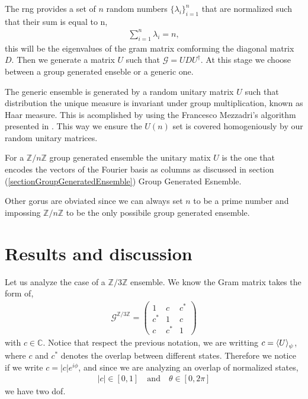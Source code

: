 \documentclass[12pt,letterpaper]{article}
\begin{document}
\begin{multicols}{2}
The \gls{rng} provides a set of $n$ random numbers $\{\lambda_i\}_{i=1}^n$ that are normalized such that their sum is equal to n,
\begin{align*}
	\sum_{i=1}^n\lambda_i=n,
\end{align*}
this will be the eigenvalues of the gram matrix comforming the diagonal matrix $D$. Then we generate a matrix $U$ such that $\mathcal{G}=UDU^\dagger$. At this stage we choose between a group generated enseble or a generic one. 

The generic ensemble is generated by a random unitary matrix $U$ such that distribution the unique measure is invariant under group multiplication, known as Haar measure\cite{haarMeasure}. This is acomplished by using the Francesco Mezzadri's algorithm presented in \cite{UnitaryMatricesGeneration}. This way we ensure the $U(n)$ set is covered homogeniously by our random unitary matrices.

For a $\mathbb{Z}/n\mathbb{Z}$ group generated ensemble the unitary matix $U$ is the one that encodes the vectors of the Fourier basis as columns as discussed in section (\ref{sectionGroupGeneratedEnsemble}) Group Generated Esnemble. 

Other gorus are obviated since we can always set $n$ to be a prime number and impossing $\mathbb{Z}/n\mathbb{Z}$ to be the only possibile group generated ensemble.

\section{Results and discussion}
 
Let us analyze the case of a $\mathbb{Z}/3\mathbb{Z}$ ensemble. We know the Gram matrix takes the form of,
\begin{align*}
	\mathcal{G}^{\mathbb{Z}/3\mathbb{Z}}=\begin{pmatrix}
		1 & c & c^*\\
		c^* & 1 & c\\
		c & c^* & 1
	\end{pmatrix}
\end{align*}
with $c\in\mathbb{C}$. Notice that respect the previous notation, we are writting $c=\braket{U}_{\psi}$, where $c$ and $c^*$ denotes the overlap between different states. Therefore we notice if we write $c=|c|e^{i\phi}$, and since we are analyzing an overlap of normalized states,
\begin{align*}
	|c|\in [0,1]\quad \text{and}\quad \theta\in[0,2\pi]
\end{align*}
we have two \gls{dof}. 


\end{multicols}
\end{document}
